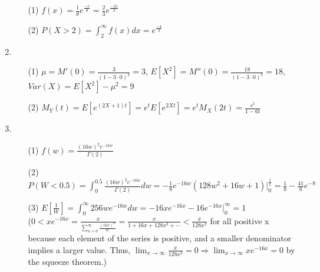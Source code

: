 \documentclass{article}
\begin{document}
\begin{enumerate}[label=\textbf{Problem \arabic*.}]
\begin{itemize}
    \item [(1)] $f(x)=\frac{1}{\theta}e^\frac{-x}{\theta}=\frac{2}{3}e^\frac{-2x}{3}$
    \item [(2)] $P(X>2)=\int_{2}^{\infty}f(x)dx=e^\frac{-4}{3}$    
\end{itemize}
\item \begin{itemize}
    \item [(1)] $\mu=M'(0)=\frac{3}{{(1-3\cdot0)}^2}=3$, $E[X^2]=M''(0)=\frac{18}{{(1-3\cdot0)}^3}=18$, $Var(X)=E[X^2]-\mu^2=9$
    \item [(2)] $M_Y(t)=E[e^{(2X+1)t}]=e^t E[e^{2Xt}]=e^t M_X(2t)=\frac{e^t}{1-6t}$
\end{itemize}
\item \begin{itemize}
    \item [(1)] $f(w)=\frac{{(16w)}^2 e^{-16w}}{\Gamma(2)}$
    \item [(2)] $P(W<0.5)=\int_{0}^{0.5}\frac{{(16w)}^2 e^{-16w}}{\Gamma(2)}dw=-\frac{1}{8}e^{-16w}(128w^2+16w+1)|_0^\frac{1}{2}=\frac{1}{8}-\frac{41}{8}e^{-8}$
    \item [(3)] $E[\frac{1}{W}]=\int_{0}^{\infty}256w e^{-16w}dw=-16x e^{-16x}-16e^{-16x}|_0^\infty=1$\\
    ($\displaystyle 0<xe^{-16x}=\frac{x}{\sum_{n=0}^{\infty}\frac{{(16x)}^n}{n!}}=\frac{x}{1+16x+128x^2+\cdots}<\frac{x}{128x^2}$ for all positive x because each element of the series is positive, 
    and a smaller denominator implies a larger value. Thus, $\displaystyle\lim_{x\rightarrow\infty}\frac{x}{128x^2}=0\Rightarrow\lim_{x\rightarrow\infty}xe^{-16x}=0$ by the squeeze theorem.)
\end{itemize}

\end{enumerate}
\end{document}
